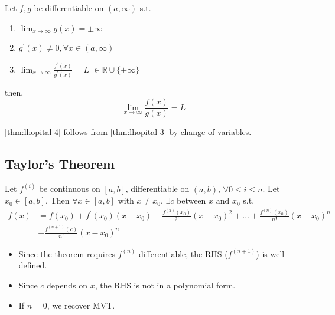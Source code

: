 \begin{theorem}
    \label{thm:lhopital-4}
    Let $f, g$ be differentiable on $(a, \infty)$
    s.t. 
    \begin{enumerate}
        \item $\lim_{x \to \infty}g(x) = \pm \infty$
        \item $g^{\prime}(x) \neq 0, \forall x \in (a, \infty)$
        \item $\lim_{x \to \infty} \frac{f^{\prime}(x)}{g^{\prime}(x)} = L$
        $\in \mathbb{R} \cup \{ \pm \infty \} $
    \end{enumerate} 
    then,
    \[
        \lim_{x \to \infty} \frac{f(x)}{g(x)} = L
    \]
\end{theorem}

\begin{remark}
    \ref{thm:lhopital-4} follows from
    \ref{thm:lhopital-3} by change of variables.
\end{remark}

\subsection{Taylor's Theorem}

\begin{theorem}
    \label{thm:taylor}
    Let $f^{(i)}$ be continuous on $[a,b]$,
    differentiable on $(a,b)$,
    $\forall 0 \leq i \leq n$.
    Let $x_0 \in [a, b]$. Then
    $\forall x \in [a, b]$ with
    $x \neq x_{0}$, 
    $\exists c $ between $x$ and $x_{0}$ s.t. 
    \begin{align*}
        f(x) &= f(x_0) 
        + f^{\prime}(x_0) (x-x_{0})
        + \frac{
            f^{(2)}(x_0)
        }{
            2!
        }
        (x - x_{0})^{2} 
        + \hdots 
        + \frac{
            f^{(n)}(x_0)
        }{
            n!
        }
        (x - x_{0})^{n}  \\
        &
        + \frac{
            f^{(n + 1)}(c)
        }{
            n!
        }
        (x - x_{0})^{n} 
    \end{align*}
\end{theorem}


\begin{remarks}
    \begin{itemize}
        \item 
    Since the theorem requires 
    $f^{(n)}$ differentiable, 
    the RHS ($f^{(n + 1)}$) is well defined.
        \item Since $c$ depends on $x$,
    the RHS is not in a polynomial form.
        \item If $n = 0$, we recover MVT.
    \end{itemize} 
\end{remarks}

